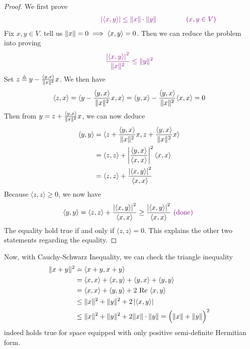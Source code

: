 \documentclass{report}
\begin{document}
\begin{proof}
We first prove 
\begin{align*}
  \vi{\hspace{3cm}\abso{\langle x,y\rangle }\leq \norm{x}\cdot\norm{y}\hspace{1.5cm}(x,y \in V)}
\end{align*}
Fix $x,y \in V$.  tell us $\| x \|=0 \implies  \langle x,y\rangle =0$. Then we can reduce the problem into proving 
\begin{align*}
\textcolor{violet}{\frac{\left|\langle x,y\rangle \right|^2}{\| x \|^2}\leq\| y \|^2  }
\end{align*}
Set $z\triangleq y-\frac{\langle y,x\rangle }{\| x \|^2}x$. We then have 
\begin{align*}
\langle z,x\rangle =\langle y-\frac{\langle y,x\rangle }{\| x \|^2}x,x \rangle =\langle y,x\rangle - \frac{\langle y,x\rangle }{\| x \|^2}\langle x,x\rangle =0
\end{align*}
Then from $y=z+\frac{\langle y,x\rangle }{\| x \|^2}x$, we can now deduce
\begin{align*}
\langle y,y\rangle &= \langle z+\frac{\langle y,x\rangle }{\| x \|^2}x,z+ \frac{\langle y,x\rangle }{\| x \|^2}x\rangle  \\
&=\langle z,z\rangle + \left|\frac{\langle y,x\rangle }{\langle x,x\rangle }\right|^2 \langle x,x\rangle \\
&=\langle z,z\rangle + \frac{\left|\langle x,y\rangle \right|^2}{\langle x,x\rangle }
\end{align*}
Because $\langle z,z\rangle\geq 0 $, we now have
\begin{align*}
\langle y,y\rangle = \langle z,z\rangle + \frac{\left|\langle x,y\rangle \right|^2}{\langle x,x\rangle }\geq  \frac{\left|\langle x,y\rangle \right|^2}{\langle x,x\rangle }\textcolor{violet}{\text{ (done) }}
\end{align*}
The equality hold true if and only if $\langle z,z\rangle =0$. This explains the other two statements regarding the equality. 
\end{proof}
\begin{mdframed}
Now, with Cauchy-Schwarz Inequality, we can check the triangle inequality 
\begin{align*}
  \| x+y \|^2&=\langle x+y,x+y\rangle \\
&=\langle x,x\rangle +\langle x,y\rangle +\langle y,x\rangle +\langle y,y\rangle \\
&= \langle x,x\rangle + \langle y,y\rangle +2\text{ Re }\langle x,y\rangle \\
&\leq \| x \|^2 + \| y \|^2 + 2\left|\langle x,y\rangle \right|\\
&\leq \| x \|^2 + \| y \|^2 + 2\| x \|\cdot \| y \|=\Big(\| x \|+\| y \|\Big)^2
\end{align*}
indeed holds true for space equipped with only positive semi-definite Hermitian form. 
\end{mdframed}
\end{document}
